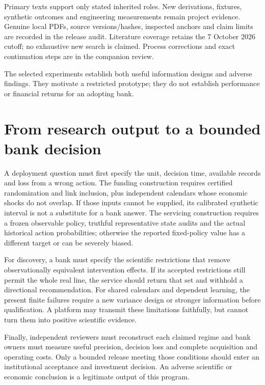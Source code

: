 Primary texts support only stated inherited roles. New derivations, fixtures, synthetic outcomes and engineering measurements remain project evidence. Genuine local PDFs, source versions/hashes, inspected anchors and claim limits are recorded in the release audit. Literature coverage retains the 7 October 2026 cutoff; no exhaustive new search is claimed. Process corrections and exact continuation steps are in the companion review.

The selected experiments establish both useful information designs
and adverse findings. They motivate a restricted prototype; they do not
establish performance or financial returns for an adopting bank.

\section*{From research output to a bounded bank decision}
A deployment question must first specify the unit, decision time, available records and loss from a wrong action. The funding construction requires certified randomization and link inclusion, plus independent calendars whose economic shocks do not overlap. If those inputs cannot be supplied, its calibrated synthetic interval is not a substitute for a bank answer. The servicing construction requires a frozen observable policy, truthful representative state audits and the actual historical action probabilities; otherwise the reported fixed-policy value has a different target or can be severely biased.

For discovery, a bank must specify the scientific restrictions that remove observationally equivalent intervention effects. If its accepted restrictions still permit the whole real line, the service should return that set and withhold a directional recommendation. For shared calendars and dependent learning, the present finite failures require a new variance design or stronger information before qualification. A platform may transmit these limitations faithfully, but cannot turn them into positive scientific evidence.

Finally, independent reviewers must reconstruct each claimed regime and bank owners must measure useful precision, decision loss and complete acquisition and operating costs. Only a bounded release meeting those conditions should enter an institutional acceptance and investment decision. An adverse scientific or economic conclusion is a legitimate output of this program.
